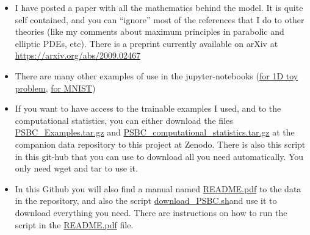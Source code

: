 \documentclass[openany,twoside]{book}
\providecommand{\tightlist}{%
  \setlength{\itemsep}{0pt}\setlength{\parskip}{0pt}}
\begin{document}
\begin{itemize}
\tightlist
\item
  I have posted a paper with all the mathematics behind the model. It is quite self contained, and you can ``ignore'' most of the references that I do to other theories (like my comments about maximum principles in parabolic and elliptic PDEs, etc). There is a preprint currently available on arXiv at \url{https://arxiv.org/abs/2009.02467}
\item
  There are many other examples of use in the jupyter-notebooks (\href{https://github.com/rafael-a-monteiro-math/Binary_classification_phase_separation/blob/master/Notebook_PSBC_1D.ipynb}{for 1D toy problem}, \href{https://github.com/rafael-a-monteiro-math/Binary_classification_phase_separation/blob/master/Notebook_PSBC_MNIST.ipynb}{for MNIST})
\item
  If you want to have access to the trainable examples I used, and to the computational statistics, you can either download the files \href{https://zenodo.org/record/4005131/files/PSBC_Examples.tar.gz?download=1}{PSBC\_Examples.tar.gz} and \href{https://zenodo.org/record/4005131/files/PSBC_computational_statistics.tar.gz?download=1}{PSBC\_computational\_statistics.tar.gz} at the companion data repository to this project at Zenodo. There is also this script in this git-hub that you can use to download all you need automatically. You only need wget and tar to use it.
\item
  In this Github you will also find a manual named \href{https://github.com/rafael-a-monteiro-math/Binary_classification_phase_separation/blob/master/README.pdf}{README.pdf} to the data in the repository, and also the script \href{https://github.com/rafael-a-monteiro-math/Binary_classification_phase_separation/blob/master/download_PSBC.sh}{download\_PSBC.sh}and use it to download everything you need. There are instructions on how to run the script in the \href{https://github.com/rafael-a-monteiro-math/Binary_classification_phase_separation/blob/master/README.pdf}{README.pdf} file.
\end{itemize}


\end{document}
